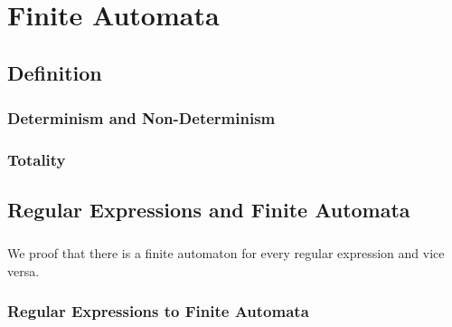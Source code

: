 \documentclass[11pt,a4paper,oneside]{book}
\begin{document}
            

    \chapter{Finite Automata}
        \section{Definition}

            \paragraph{}

            \subsection{Determinism and Non-Determinism}

                \paragraph{}

            \subsection{Totality}

                \paragraph{}

        \section{Regular Expressions and Finite Automata}

            \paragraph{} We proof that there is a finite automaton for every regular expression and vice versa.  

            \subsection{Regular Expressions to Finite Automata}

                \paragraph{}
\end{document}
